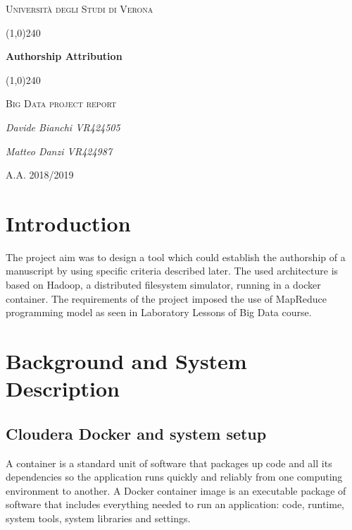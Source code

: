 \documentclass[a4paper]{article}
\begin{document}
	\clearpage
	\begin{titlepage}
		\centering
		\vspace*{\fill}
		{\scshape\LARGE Università degli Studi di Verona \par}
		\vspace{1.5cm}
		\line(1,0){240} \\
		{\huge\bfseries Authorship Attribution\par}
		\line(1,0){240} \\
		\vspace{0.5cm}
		{\scshape\Large Big Data project report\par}
		\vspace{2cm}
		{\Large\itshape Davide Bianchi VR424505\par
		\Large\itshape Matteo Danzi VR424987\par}
		\vspace{1cm}
		\vspace{5cm}
		\vspace*{\fill}
		{\large A.A. 2018/2019\par}
	\end{titlepage}
	\thispagestyle{empty}
	\newpage
	\tableofcontents
	\newpage
	
	\section{Introduction}
	The project aim was to design a tool which could establish the authorship of a manuscript by using specific criteria described later. 
	The used architecture is based on Hadoop, a distributed filesystem simulator, running in a docker container. The requirements of the project imposed the use of MapReduce programming model as seen in Laboratory Lessons of Big Data course.

	\section{Background and System Description}

    \subsection{Cloudera Docker and system setup}
		A container is a standard unit of software that packages up code and all its dependencies so the application runs quickly and reliably from one computing environment to another. A Docker container image is an executable package of software that includes everything needed to run an application: code, runtime, system tools, system libraries and settings.
\end{document}
